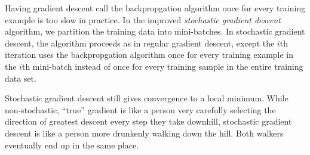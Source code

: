 \documentclass{article}
\begin{document}
	Having gradient descent call the backpropgation algorithm once for every training example is too slow in practice. In the improved \textit{stochastic gradient descent} algorithm, we partition the training data into mini-batches. In stochastic gradient descent, the algorithm proceeds as in regular gradient descent, except the $i$th iteration uses the backpropgation algorithm once for every training example in the $i$th mini-batch instead of once for every training sample in the entire training data set.
	
	Stochastic gradient descent still gives convergence to a local minimum. While non-stochastic, ``true'' gradient is like a person very carefully selecting the direction of greatest descent every step they take downhill, stochastic gradient descent is like a person more drunkenly walking down the hill. Both walkers eventually end up in the same place.
\end{document}
